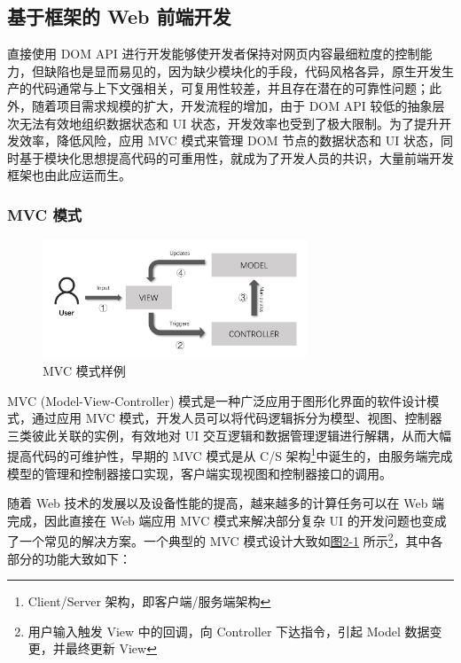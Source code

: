 \documentclass[winfonts,master,twoside]{njuthesis}
\begin{document}
\subsection{基于框架的 Web 前端开发}

直接使用 DOM API 进行开发能够使开发者保持对网页内容最细粒度的控制能力，但缺陷也是显而易见的，因为缺少模块化的手段，代码风格各异，原生开发生产的代码通常与上下文强相关，可复用性较差，并且存在潜在的可靠性问题\cite{ocariza2013empirical}\cite{icse2015javascript-mvc}；此外，随着项目需求规模的扩大，开发流程的增加，由于 DOM API 较低的抽象层次无法有效地组织数据状态和 UI 状态，开发效率也受到了极大限制。为了提升开发效率，降低风险，应用 MVC 模式来管理 DOM 节点的数据状态和 UI 状态，同时基于模块化思想提高代码的可重用性，就成为了开发人员的共识，大量前端开发框架也由此应运而生。

\subsubsection{MVC 模式}\label{mvc-pattern}

\begin{figure}[h]
    \centering
    \includegraphics[width=0.7\textwidth]{figure/chapter-2/MVC-update.png}
    \caption{MVC 模式样例}
    \label{mvc-architecture-example}
\end{figure}

MVC (Model-View-Controller) 模式是一种广泛应用于图形化界面的软件设计模式，通过应用 MVC 模式，开发人员可以将代码逻辑拆分为模型、视图、控制器三类彼此关联的实例，有效地对 UI 交互逻辑和数据管理逻辑进行解耦，从而大幅提高代码的可维护性，早期的 MVC 模式是从 C/S 架构\footnote{Client/Server 架构，即客户端/服务端架构}中诞生的，由服务端完成模型的管理和控制器接口实现，客户端实现视图和控制器接口的调用\cite{leff2001web}。

随着 Web 技术的发展以及设备性能的提高，越来越多的计算任务可以在 Web 端完成，因此直接在 Web 端应用 MVC 模式来解决部分复杂 UI 的开发问题也变成了一个常见的解决方案\cite{taraghi2010simple}。一个典型的 MVC 模式设计大致如\hyperref[mvc-architecture-example]{图2-1} 所示\footnote{用户输入触发 View 中的回调，向 Controller 下达指令，引起 Model 数据变更，并最终更新 View}，其中各部分的功能大致如下：
\end{document}
